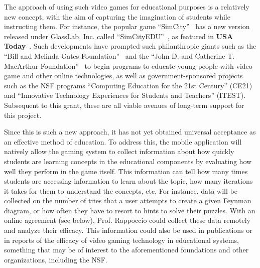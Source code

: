 \documentclass[12pt]{proposalnsf}
\begin{document}

The approach of using such video games for educational purposes is a
relatively new concept, with the aim of capturing
the imagination of students while instructing them. For instance, the
popular game ``SimCity''~\cite{simcity} has a new version released under GlassLab,
Inc. called ``SimCityEDU''~\cite{simcityedu}, as featured in 
{\bf USA Today}~\cite{simcityedu_usatoday}. Such developments have
prompted such philanthropic giants such as the ``Bill and Melinda
Gates Foundation''~\cite{gates}
and the ``John D. and Catherine T. MacArthur
Foundation''~\cite{macfound} to begin programs to educate young people
with video game and other online technologies, as well as
government-sponsored projects such as the NSF programs ``Computing
Education for the 21st Century'' (CE21) and ``Innovative Technology
Experiences for Students and Teachers'' (ITEST). Subsequent to
this grant, these are all viable avenues of long-term support for
this project.


Since this is such a new approach, it has not yet
obtained universal acceptance as an effective method of education. To
address this, the mobile
application will natively allow the gaming system to collect
information about how quickly students are learning concepts in the
educational components by evaluating how well they perform in the game
itself. This information can tell how many times students are
accessing information to learn about the topic, how many iterations it
takes for them to understand the concepts, etc. For instance, data
will be collected on the number of tries that
a user attempts to create a given Feynman diagram, or how often they
have to resort to hints to solve their puzzles. With an online
agreement (see below), Prof. Rappoccio could collect these data remotely and analyze
their efficacy. This information could also be used in publications or
in reports of the efficacy of video gaming technology in educational
systems, something that may be of interest to the aforementioned
foundations and other organizations, including the NSF. 
\end{document}
